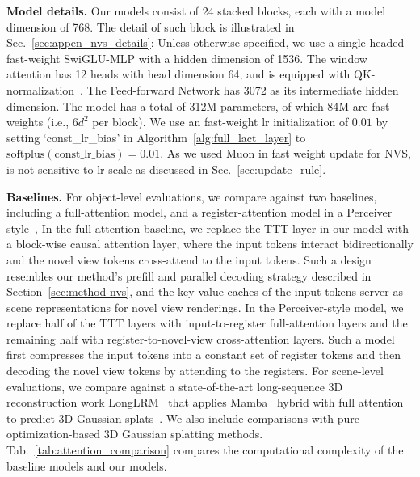 \noindent\textbf{Model details.}
Our models consist of 24 stacked \methodname{} blocks, each with a model dimension of 768. 
The detail of such block is illustrated in Sec.~\ref{sec:appen_nvs_details}:
Unless otherwise specified, we use a single-headed fast-weight SwiGLU-MLP with a hidden dimension of 1536. 
The window attention has 12 heads with head dimension 64, and is equipped with QK-normalization~\cite{henry2020query}.
The Feed-forward Network has 3072 as its intermediate hidden dimension.
The model has a total of 312M parameters, of which 84M are fast weights (i.e., $6 d^2$ per block).
We use an fast-weight lr initialization of $0.01$ by setting `const\_lr\_bias' in Algorithm~\ref{alg:full_lact_layer} to $\mathrm{softplus}(\text{const\_lr\_bias}) = 0.01$.
As we used Muon in fast weight update for NVS, \methodname{} is not sensitive to lr scale as discussed in Sec.~\ref{sec:update_rule}.

\noindent\textbf{Baselines.}
For object-level evaluations, we compare against two baselines, including a full-attention model, 
and a register-attention model in a Perceiver style~\cite{jaegle2021perceiver}, 
In the full-attention baseline, we 
replace the TTT layer in our model with a block-wise causal attention layer, where 
the input tokens interact bidirectionally and the novel view tokens cross-attend 
to the input tokens. Such a design resembles our method's prefill and parallel 
decoding strategy described in Section~\ref{sec:method-nvs}, and the key-value caches 
of the input tokens server as scene representations for novel view renderings. 
In the Perceiver-style model, we replace half of the TTT layers with 
input-to-register full-attention layers and the remaining half with register-to-novel-view
cross-attention layers. Such a model first compresses the input tokens into a constant 
set of register tokens and then decoding the novel view tokens by attending to the registers.
For scene-level evaluations, we compare against a state-of-the-art long-sequence 3D 
reconstruction work LongLRM~\cite{ziwen2024long} that applies Mamba~\cite{gu2023mamba} hybrid with full attention to predict 
3D Gaussian splats~\cite{kerbl20233d}. 
We also include comparisons with pure optimization-based 3D Gaussian splatting methods.
Tab.~\ref{tab:attention_comparison} compares the computational complexity of the 
baseline models and our models. 


